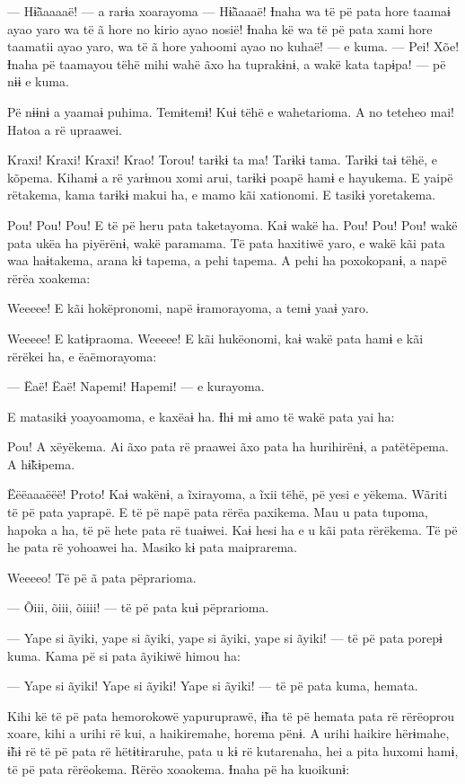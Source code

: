 --- Hɨ̃ãaaaaë! --- a rarɨa xoarayoma --- Hɨ̃ãaaaë! Ɨnaha wa të pë pata
hore taamaɨ ayao yaro wa të ã hore no kirio ayao nosië! Ɨnaha kë wa të
pë pata xami hore taamatii ayao yaro, wa të ã hore yahoomi ayao no
kuhaë! --- e kuma. --- Pei! Xõe! Ɨnaha pë taamayou tëhë mihi wahë ãxo ha
tuprakɨnɨ, a wakë kata tapɨpa! --- pë nɨɨ e kuma. 

Pë nɨɨnɨ a yaamaɨ puhima. Temɨtemɨ! Kuɨ tëhë e wahetarioma. A no teteheo
mai! Hatoa a rë upraawei. 

Kraxi! Kraxi! Kraxi! Krao! Torou! tarɨkɨ ta ma! Tarɨkɨ tama. Tarɨkɨ taɨ
tëhë, e kõpema. Kihamɨ a rë yarɨmou xomi arui, tarɨkɨ poapë hamɨ e
hayukema. E yaipë rëtakema, kama tarɨkɨ makui ha, e mamo kãi xationomi.
E tasikɨ yoretakema. 

Pou! Pou! Pou! E të pë heru pata taketayoma. Kaɨ wakë ha. Pou! Pou! Pou!
wakë pata ukëa ha piyërënɨ, wakë paramama. Të pata haxitiwë yaro, e wakë
kãi pata waa haɨtakema, arana kɨ tapema, a pehi tapema. A pehi ha
poxokopanɨ, a napë rërëa xoakema:

Weeeee! E kãi hokëpronomi, napë ɨramorayoma, a temɨ yaaɨ yaro. 

Weeeee! E katɨpraoma. Weeeee! E kãi hukëonomi, kaɨ wakë pata hamɨ e kãi
rërëkei ha, e ëaëmorayoma:

--- Ëaë! Ëaë! Napemi! Hapemi! --- e kurayoma. 

E matasikɨ yoayoamoma, e kaxëaɨ ha. Ɨhɨ mɨ amo të wakë pata yai ha: 

Pou! A xëyëkema. Ai ãxo pata rë praawei ãxo pata ha hurihirënɨ, a
patëtëpema. A hɨ̃kɨpema. 

Ëëëaaaëëë! Proto! Kaɨ wakënɨ, a ĩxirayoma, a ĩxii tëhë, pë yesi e
yëkema. Wãriti të pë pata yaprapë. E të pë napë pata rërëa paxikema. Mau
u pata tupoma, hapoka a ha, të pë hete pata rë tuaɨwei. Kaɨ hesi ha e u
kãi pata rërëkema. Të pë he pata rë yohoawei ha. Masiko kɨ pata
maiprarema. 

Weeeeo! Të pë ã pata pëprarioma. 

--- Õiii, õiii, õiiii! --- të pë pata kuɨ pëprarioma.

--- Yape si ãyiki, yape si ãyiki, yape si ãyiki, yape si ãyiki! --- të
pë pata porepɨ kuma. Kama pë si pata ãyikiwë himou ha: 

--- Yape si ãyiki! Yape si ãyiki! Yape si ãyiki! --- të pë pata kuma,
hemata. 

Kihi kë të pë pata hemorokowë yapuruprawë, ɨ̃ha të pë hemata pata rë
rërëoprou xoare, kihi a urihi rë kui, a haikiremahe, horema pënɨ. A urihi haikire hërɨmahe, ɨ̃hɨ rë të pë pata rë hëtɨtɨraruhe, pata u kɨ rë
kutarenaha, hei a pita huxomi hamɨ, të pë pata rërëokema. Rërëo
xoaokema. Ɨnaha pë ha kuoikunɨ: 


